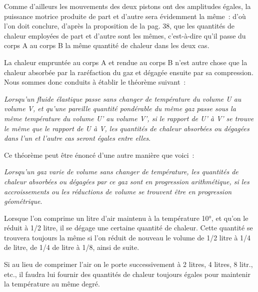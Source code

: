 \documentclass[french,twoside]{book} %
\begin{document}
Comme d’ailleurs les mouvements des deux pistons ont des amplitudes égales, la puissance motrice produite de part et d’autre sera évidemment la même : d’où l’on doit conclure, d’après la proposition de la pag. 38, que les quantités de chaleur employées de part et d’autre sont les mêmes, c’est-à-dire qu’il passe du corps A au corps B la même quantité de chaleur dans les deux cas.\par
La chaleur empruntée au corps A et rendue au corps B n’est autre chose que la chaleur absorbée par la raréfaction du gaz et dégagée ensuite par sa compression. Nous sommes donc conduits à établir le théorème suivant :\par
\emph{Lorsqu’un fluide élastique passe sans changer de température du volume U au volume V, et qu’une pareille quantité pondérable du même gaz passe sous la même température du volume U’ au volume V’, si le rapport de U’ à V’ se trouve le même que le rapport de U à V, les quantités de chaleur absorbées ou dégagées dans l’un et l’autre cas seront égales entre elles}.\par
Ce théorème peut être énoncé d’une autre manière que voici :\par
\emph{Lorsqu’un gaz varie de volume sans changer de température, les quantités de chaleur absorbées ou dégagées par ce gaz sont en progression arithmétique, si les accroissements ou les réductions de volume se trouvent être en progression géométrique}.\par
Lorsque l’on comprime un litre d’air maintenu à la température 10°, et qu’on le réduit à 1/2 litre, il se dégage une certaine quantité de chaleur. Cette quantité se trouvera toujours la même si l’on réduit de nouveau le volume de 1/2 litre à 1/4 de litre, de 1/4 de litre à 1/8, ainsi de suite.\par
Si au lieu de comprimer l’air on le porte successivement à 2 litres, 4 litres, 8 litr., etc., il faudra lui fournir des quantités de chaleur toujours égales pour maintenir la température au même degré.\par
\end{document}

